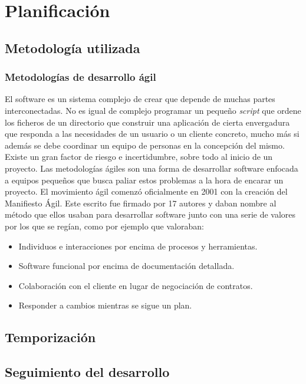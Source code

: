 \chapter{Planificación}

\section{Metodología utilizada}

\subsection{Metodologías de desarrollo ágil}
El software es un sistema complejo de crear que depende de muchas partes interconectadas. No es igual de complejo programar un pequeño \textit{script} que ordene los ficheros de un directorio que construir una aplicación de cierta envergadura que responda a las necesidades de un usuario o un cliente concreto, mucho más si además se debe coordinar un equipo de personas en la concepción del mismo. Existe un gran factor de riesgo e incertidumbre, sobre todo al inicio de un proyecto. Las metodologías ágiles son una forma de desarrollar software enfocada a equipos pequeños que busca paliar estos problemas a la hora de encarar un proyecto. El movimiento ágil comenzó oficialmente en 2001 con la creación del Manifiesto Ágil. Este escrito fue firmado por 17 autores y daban nombre al método que ellos usaban para desarrollar software junto con una serie de valores por los que se regían, como por ejemplo que valoraban:

\begin{itemize}
    \item Individuos e interacciones por encima de procesos y herramientas.
    \item Software funcional por encima de documentación detallada.
    \item Colaboración con el cliente en lugar de negociación de contratos.
    \item Responder a cambios mientras se sigue un plan.
\end{itemize}

\section{Temporización}

\section{Seguimiento del desarrollo}
